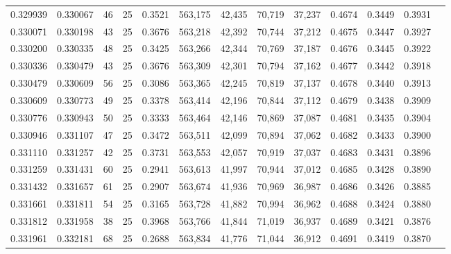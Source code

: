 \begin{tabular}{rrrrrrrrrrrrr}
0.329939 & 0.330067 &    46 &  25 &                                     0.3521 & 563,175 &  42,435 &  70,719 &  37,237 & 0.4674 & 0.3449 & 0.3931 \\
0.330071 & 0.330198 &    43 &  25 &                                     0.3676 & 563,218 &  42,392 &  70,744 &  37,212 & 0.4675 & 0.3447 & 0.3927 \\
0.330200 & 0.330335 &    48 &  25 &                                     0.3425 & 563,266 &  42,344 &  70,769 &  37,187 & 0.4676 & 0.3445 & 0.3922 \\
0.330336 & 0.330479 &    43 &  25 &                                     0.3676 & 563,309 &  42,301 &  70,794 &  37,162 & 0.4677 & 0.3442 & 0.3918 \\
0.330479 & 0.330609 &    56 &  25 &                                     0.3086 & 563,365 &  42,245 &  70,819 &  37,137 & 0.4678 & 0.3440 & 0.3913 \\
0.330609 & 0.330773 &    49 &  25 &                                     0.3378 & 563,414 &  42,196 &  70,844 &  37,112 & 0.4679 & 0.3438 & 0.3909 \\
0.330776 & 0.330943 &    50 &  25 &                                     0.3333 & 563,464 &  42,146 &  70,869 &  37,087 & 0.4681 & 0.3435 & 0.3904 \\
0.330946 & 0.331107 &    47 &  25 &                                     0.3472 & 563,511 &  42,099 &  70,894 &  37,062 & 0.4682 & 0.3433 & 0.3900 \\
0.331110 & 0.331257 &    42 &  25 &                                     0.3731 & 563,553 &  42,057 &  70,919 &  37,037 & 0.4683 & 0.3431 & 0.3896 \\
0.331259 & 0.331431 &    60 &  25 &                                     0.2941 & 563,613 &  41,997 &  70,944 &  37,012 & 0.4685 & 0.3428 & 0.3890 \\
0.331432 & 0.331657 &    61 &  25 &                                     0.2907 & 563,674 &  41,936 &  70,969 &  36,987 & 0.4686 & 0.3426 & 0.3885 \\
0.331661 & 0.331811 &    54 &  25 &                                     0.3165 & 563,728 &  41,882 &  70,994 &  36,962 & 0.4688 & 0.3424 & 0.3880 \\
0.331812 & 0.331958 &    38 &  25 &                                     0.3968 & 563,766 &  41,844 &  71,019 &  36,937 & 0.4689 & 0.3421 & 0.3876 \\
0.331961 & 0.332181 &    68 &  25 &                                     0.2688 & 563,834 &  41,776 &  71,044 &  36,912 & 0.4691 & 0.3419 & 0.3870 \\

\end{tabular}
